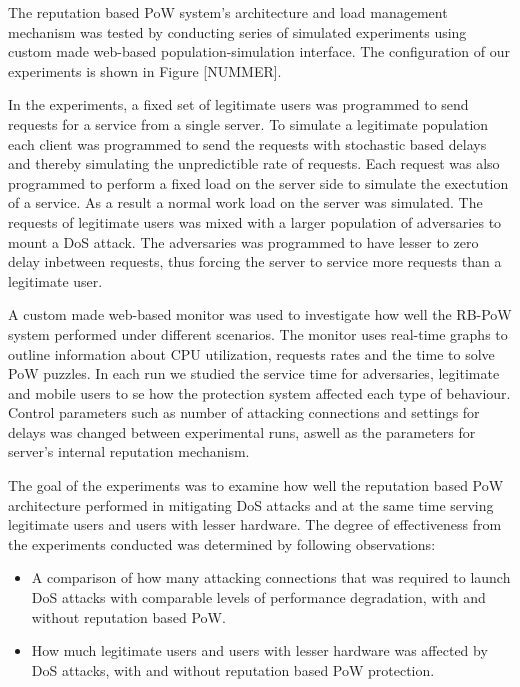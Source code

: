 The reputation based PoW system's architecture and load management mechanism was tested by conducting series of simulated experiments using custom made web-based population-simulation interface. The configuration of our experiments is shown in Figure [NUMMER].

In the experiments, a fixed set of legitimate users was programmed to send requests for a service from a single server. To simulate a legitimate population each client was programmed to send the requests with stochastic based delays and thereby simulating the unpredictible rate of requests. Each request was also programmed to perform a fixed load on the server side to simulate the exectution of a service. As a result a normal work load on the server was simulated. The requests of legitimate users was mixed with a larger population of adversaries to mount a DoS attack. The adversaries was programmed to have lesser to zero delay inbetween requests, thus forcing the server to service more requests than a legitimate user. 

A custom made web-based monitor was used to investigate how well the RB-PoW system performed under different scenarios. The monitor uses real-time graphs to outline information about CPU utilization, requests rates and the time to solve PoW puzzles. In each run we studied the service time for adversaries, legitimate and mobile users to se how the protection system affected each type of behaviour. Control parameters such as number of attacking connections and settings for delays was changed between experimental runs, aswell as the parameters for server's internal reputation mechanism.

The goal of the experiments was to examine how well the reputation based PoW architecture performed in mitigating DoS attacks and at the same time serving legitimate users and users with lesser hardware. The degree of effectiveness from the experiments conducted was determined by following observations:

\begin{itemize}
\item A comparison of how many attacking connections that was required to launch DoS attacks with comparable levels of performance degradation, with and without reputation based PoW.

\item How much legitimate users and users with lesser hardware was affected by DoS attacks, with and without reputation based PoW protection.
\end{itemize}

